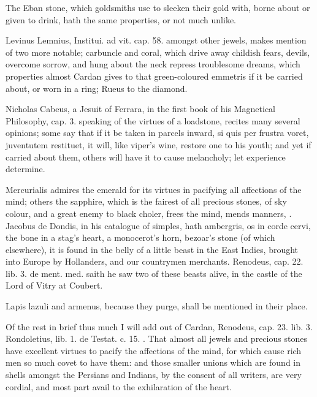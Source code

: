 {The Eban stone, which goldsmiths use to sleeken their gold with, borne
about or given to drink, hath the same properties, or not much
unlike.

Levinus Lemnius, Institui. ad vit. cap. 58. amongst other jewels, makes
mention of two more notable; carbuncle and coral, which drive
away childish fears, devils, overcome sorrow, and hung about the neck
repress troublesome dreams, which properties almost Cardan gives to
that green-coloured emmetris if it be carried about, or worn in a
ring; Rueus to the diamond.

Nicholas Cabeus, a Jesuit of Ferrara, in the first book of his
Magnetical Philosophy, cap. 3. speaking of the virtues of a loadstone,
recites many several opinions; some say that if it be taken in parcels
inward, si quis per frustra voret, juventutem restituet, it will, like
viper's wine, restore one to his youth; and yet if carried about them,
others will have it to cause melancholy; let experience determine.

Mercurialis admires the emerald for its virtues in pacifying all
affections of the mind; others the sapphire, which is the fairest
of all precious stones, of sky colour, and a great enemy to black
choler, frees the mind, mends manners, \etc{}. Jacobus de Dondis, in his
catalogue of simples, hath ambergris, os in corde cervi, the bone
in a stag's heart, a monocerot's horn, bezoar's stone (of which
elsewhere), it is found in the belly of a little beast in the East
Indies, brought into Europe by Hollanders, and our countrymen
merchants. Renodeus, cap. 22. lib. 3. de ment. med. saith he saw two of
these beasts alive, in the castle of the Lord of Vitry at Coubert.

Lapis lazuli and armenus, because they purge, shall be mentioned in
their place.

Of the rest in brief thus much I will add out of Cardan, Renodeus, cap.
23. lib. 3. Rondoletius, lib. 1. de Testat. c. 15. \etc{}. That
almost all jewels and precious stones have excellent virtues to pacify
the affections of the mind, for which cause rich men so much covet to
have them: and those smaller unions which are found in shells
amongst the Persians and Indians, by the consent of all writers, are
very cordial, and most part avail to the exhilaration of the heart.

}
